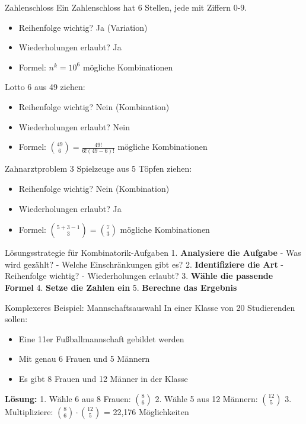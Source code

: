 \begin{example}{Zahlenschloss}
Ein Zahlenschloss hat 6 Stellen, jede mit Ziffern 0-9.
\begin{itemize}
\item Reihenfolge wichtig? Ja (Variation)
\item Wiederholungen erlaubt? Ja
\item Formel: $n^k = 10^6$ mögliche Kombinationen
\end{itemize}
\end{example}

\begin{example}{Lotto}
6 aus 49 ziehen:
\begin{itemize}
\item Reihenfolge wichtig? Nein (Kombination)
\item Wiederholungen erlaubt? Nein
\item Formel: $\binom{49}{6} = \frac{49!}{6!(49-6)!}$ mögliche Kombinationen
\end{itemize}
\end{example}

\begin{example}{Zahnarztproblem}
3 Spielzeuge aus 5 Töpfen ziehen:
\begin{itemize}
\item Reihenfolge wichtig? Nein (Kombination)
\item Wiederholungen erlaubt? Ja
\item Formel: $\binom{5+3-1}{3} = \binom{7}{3}$ mögliche Kombinationen
\end{itemize}
\end{example}

\begin{KR}{Lösungsstrategie für Kombinatorik-Aufgaben}
1. \textbf{Analysiere die Aufgabe}
   - Was wird gezählt?
   - Welche Einschränkungen gibt es?
2. \textbf{Identifiziere die Art}
   - Reihenfolge wichtig?
   - Wiederholungen erlaubt?
3. \textbf{Wähle die passende Formel}
4. \textbf{Setze die Zahlen ein}
5. \textbf{Berechne das Ergebnis}
\end{KR}

\begin{example}{Komplexeres Beispiel: Mannschaftsauswahl}
In einer Klasse von 20 Studierenden sollen:
\begin{itemize}
\item Eine 11er Fußballmannschaft gebildet werden
\item Mit genau 6 Frauen und 5 Männern
\item Es gibt 8 Frauen und 12 Männer in der Klasse
\end{itemize}

\textbf{Lösung:}
1. Wähle 6 aus 8 Frauen: $\binom{8}{6}$
2. Wähle 5 aus 12 Männern: $\binom{12}{5}$
3. Multipliziere: $\binom{8}{6} \cdot \binom{12}{5}$ = 22,176 Möglichkeiten
\end{example}

